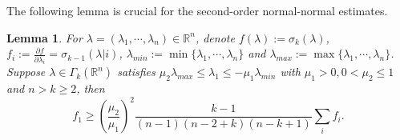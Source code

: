 \documentclass[12pt]{amsart}
\newtheorem{lemma}[theorem]{Lemma}
\theoremstyle{definition}
\theoremstyle{remark}
\numberwithin{equation}{section}
\begin{document}
The following lemma is crucial for the second-order normal-normal estimates.
\begin{lemma}\label{sigma_k_lemma}
	For $\lambda = (\lambda_1, \cdots, \lambda_n) \in \mathbb{R}^n$, 
	denote $f(\lambda) := \sigma_k(\lambda)$, $f_i := \frac{\partial f}{\partial \lambda_i} = \sigma_{k-1}(\lambda | i)$, $\lambda_{min} := \min\{ \lambda_1, \cdots, \lambda_n \}$ and $\lambda_{max} := \max\{\lambda_1, \cdots, \lambda_n\}$. Suppose $\lambda \in \Gamma_{k}(\mathbb{R}^n)$ satisfies $\mu_2 \lambda_{max} \leq \lambda_1 \leq - \mu_1 \lambda_{min}$ with $\mu_1 > 0, 0 < \mu_2 \leq 1$ and $n > k \geq 2$, then 
	\begin{equation}\label{sigma_k_lemma_0}
	f_1 \geq \left( \frac{\mu_2}{\mu_1} \right)^2 \frac{k - 1}{(n-1)(n-2+k) (n-k+1)} \sum_i f_i.
	\end{equation} 
\end{lemma}
\end{document}
